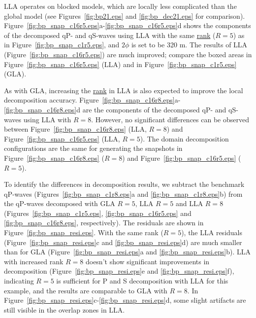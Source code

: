\documentclass[manuscript,ulem,graphix,revised]{geophysics}
\begin{document}
LLA operates on blocked models, which are locally less complicated than the global model (see Figures~\ref{fig:bp21.eps} and \ref{fig:bp_dec21.eps} for comparison). Figure~\ref{fig:bp_snap_c16r5.eps}a-\ref{fig:bp_snap_c16r5.eps}d shows the components of the decomposed qP- and qS-waves using LLA with the same \uline{rank} \marginnote{[1]} ($R=5$) as in Figure~\ref{fig:bp_snap_c1r5.eps}, and $2\phi$ is set to be 320 m.
The results of LLA (Figure~\ref{fig:bp_snap_c16r5.eps}) are much improved; compare the boxed areas in Figure~\ref{fig:bp_snap_c16r5.eps} (LLA) and in Figure~\ref{fig:bp_snap_c1r5.eps} (GLA). 

As with GLA, increasing the \marginnote{[1]}\uline{rank} in LLA is also expected to improve the local decomposition accuracy. Figure~\ref{fig:bp_snap_c16r8.eps}a-\ref{fig:bp_snap_c16r8.eps}d are the components of the decomposed qP- and qS-waves using LLA with $R=8$. However, no significant differences can be observed between Figure~\ref{fig:bp_snap_c16r8.eps} (LLA, $R=8$) and Figure~\ref{fig:bp_snap_c16r5.eps} (LLA, $R=5$). The domain decomposition configurations are the same for generating the snapshots in Figure~\ref{fig:bp_snap_c16r8.eps} ($R=8$) and Figure~\ref{fig:bp_snap_c16r5.eps} ($R=5$). 

To identify the differences in decomposition results, we subtract the benchmark qP-waves (Figures~\ref{fig:bp_snap_c1r8.eps}a and \ref{fig:bp_snap_c1r8.eps}b) from the qP-waves decomposed with GLA $R=5$, LLA $R=5$ and LLA $R=8$ (Figures~\ref{fig:bp_snap_c1r5.eps}, \ref{fig:bp_snap_c16r5.eps} and \ref{fig:bp_snap_c16r8.eps}, respectively). The residuals are shown in Figure~\ref{fig:bp_snap_resi.eps}.
With the same rank ($R=5$), the LLA residuals (Figure~\ref{fig:bp_snap_resi.eps}c and \ref{fig:bp_snap_resi.eps}d) are much smaller than for GLA (Figure~\ref{fig:bp_snap_resi.eps}a and \ref{fig:bp_snap_resi.eps}b). LLA with increased rank $R=8$ doesn't show significant improvements in decomposition (Figure~\ref{fig:bp_snap_resi.eps}e and \ref{fig:bp_snap_resi.eps}f), indicating $R=5$ is sufficient for P and S decomposition with LLA for this example, and the results are comparable to GLA with $R=8$. In Figure~\ref{fig:bp_snap_resi.eps}c-\ref{fig:bp_snap_resi.eps}d, some slight artifacts are still visible in the overlap zones in LLA.  
\end{document}
